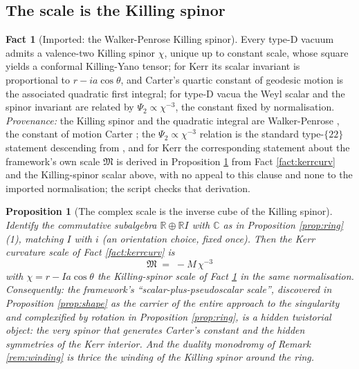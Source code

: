 \documentclass[11pt]{article}
\newtheorem{proposition}[theorem]{Proposition}
\theoremstyle{definition}
\newtheorem{fact}[theorem]{Fact}
\newcommand{\R}{\mathbb{R}}
\newcommand{\C}{\mathbb{C}}
\begin{document}
\subsection{The scale is the Killing spinor}\label{subsec:killing}

\begin{fact}[Imported: the Walker-Penrose Killing spinor]\label{fact:wp}
Every type-D vacuum admits a valence-two Killing spinor $\chi$, unique up to constant scale, whose square yields a conformal Killing-Yano tensor; for Kerr its scalar invariant is proportional to $r - ia\cos\theta$, and Carter's quartic constant of geodesic motion is the associated quadratic first integral; for type-D vacua the Weyl scalar and the spinor invariant are related by $\Psi_2 \propto \chi^{-3}$, the constant fixed by normalisation. \emph{Provenance:} the Killing spinor and the quadratic integral are Walker-Penrose \cite{WalkerPenrose1970}, the constant of motion Carter \cite{Carter1968}; the $\Psi_2 \propto \chi^{-3}$ relation is the standard type-$\{22\}$ statement descending from \cite{WalkerPenrose1970}, and for Kerr the corresponding statement about the framework's own scale $\mathfrak M$ is derived in Proposition \ref{prop:killing} from Fact \ref{fact:kerrcurv} and the Killing-spinor scalar above, with no appeal to this clause and none to the imported normalisation; the script checks that derivation.
\end{fact}

\begin{proposition}[The complex scale is the inverse cube of the Killing spinor]\label{prop:killing}
Identify the commutative subalgebra $\R \oplus \R I$ with $\C$ as in Proposition \ref{prop:ring}(1), matching $I$ with $i$ (an orientation choice, fixed once). Then the Kerr curvature scale of Fact \ref{fact:kerrcurv} is
\[
\mathfrak M \;=\; -M\,\chi^{-3}
\]
with $\chi = r - Ia\cos\theta$ the Killing-spinor scale of Fact \ref{fact:wp} in the same normalisation. Consequently: the framework's ``scalar-plus-pseudoscalar scale'', discovered in Proposition \ref{prop:shape} as the carrier of the entire approach to the singularity and complexified by rotation in Proposition \ref{prop:ring}, is a hidden twistorial object: the very spinor that generates Carter's constant and the hidden symmetries of the Kerr interior. And the duality monodromy of Remark \ref{rem:winding} is thrice the winding of the Killing spinor around the ring.
\end{proposition}
\end{document}
